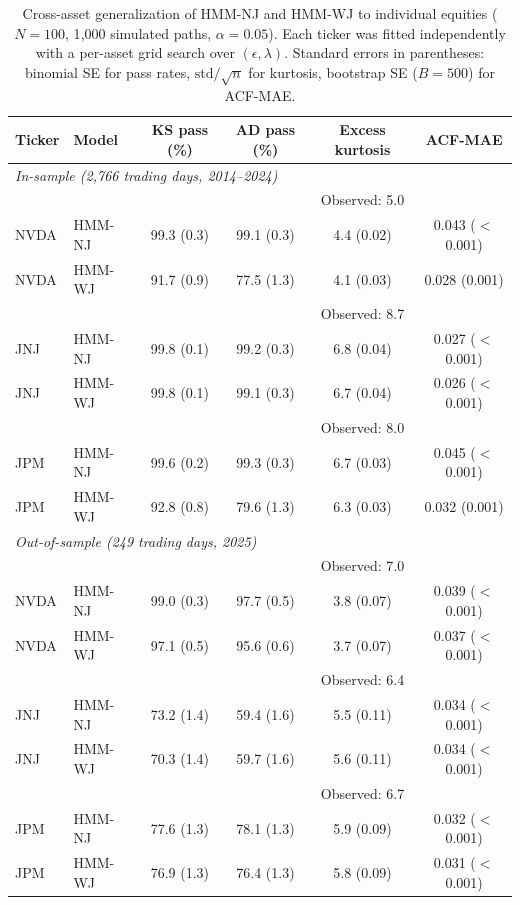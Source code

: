 \begin{table}[tp]
\centering
\caption{Cross-asset generalization of HMM-NJ and HMM-WJ to individual equities ($N=100$, 1{,}000 simulated paths, $\alpha=0.05$). Each ticker was fitted independently with a per-asset grid search over $(\epsilon, \lambda)$. Standard errors in parentheses: binomial SE for pass rates, $\text{std}/\!\sqrt{n}$ for kurtosis, bootstrap SE ($B=500$) for ACF-MAE.}
\label{tab:cross_asset}
\small
\begin{tabular}{@{}llcccc@{}}
\toprule
\textbf{Ticker} & \textbf{Model} & \textbf{KS pass (\%)} & \textbf{AD pass (\%)} & \textbf{Excess kurtosis} & \textbf{ACF-MAE} \\ \midrule
\multicolumn{6}{l}{\textit{In-sample (2{,}766 trading days, 2014--2024)}} \\[2pt]
& & & & Observed: 5.0 & \\
NVDA & HMM-NJ & 99.3 (0.3) & 99.1 (0.3) & 4.4 (0.02) & 0.043 ({$<$}0.001) \\
NVDA & HMM-WJ & 91.7 (0.9) & 77.5 (1.3) & 4.1 (0.03) & 0.028 (0.001) \\[2pt]
& & & & Observed: 8.7 & \\
JNJ  & HMM-NJ & 99.8 (0.1) & 99.2 (0.3) & 6.8 (0.04) & 0.027 ({$<$}0.001) \\
JNJ  & HMM-WJ & 99.8 (0.1) & 99.1 (0.3) & 6.7 (0.04) & 0.026 ({$<$}0.001) \\[2pt]
& & & & Observed: 8.0 & \\
JPM  & HMM-NJ & 99.6 (0.2) & 99.3 (0.3) & 6.7 (0.03) & 0.045 ({$<$}0.001) \\
JPM  & HMM-WJ & 92.8 (0.8) & 79.6 (1.3) & 6.3 (0.03) & 0.032 (0.001) \\[4pt]
\multicolumn{6}{l}{\textit{Out-of-sample (249 trading days, 2025)}} \\[2pt]
& & & & Observed: 7.0 & \\
NVDA & HMM-NJ & 99.0 (0.3) & 97.7 (0.5) & 3.8 (0.07) & 0.039 ({$<$}0.001) \\
NVDA & HMM-WJ & 97.1 (0.5) & 95.6 (0.6) & 3.7 (0.07) & 0.037 ({$<$}0.001) \\[2pt]
& & & & Observed: 6.4 & \\
JNJ  & HMM-NJ & 73.2 (1.4) & 59.4 (1.6) & 5.5 (0.11) & 0.034 ({$<$}0.001) \\
JNJ  & HMM-WJ & 70.3 (1.4) & 59.7 (1.6) & 5.6 (0.11) & 0.034 ({$<$}0.001) \\[2pt]
& & & & Observed: 6.7 & \\
JPM  & HMM-NJ & 77.6 (1.3) & 78.1 (1.3) & 5.9 (0.09) & 0.032 ({$<$}0.001) \\
JPM  & HMM-WJ & 76.9 (1.3) & 76.4 (1.3) & 5.8 (0.09) & 0.031 ({$<$}0.001) \\
\bottomrule
\end{tabular}
\end{table}

